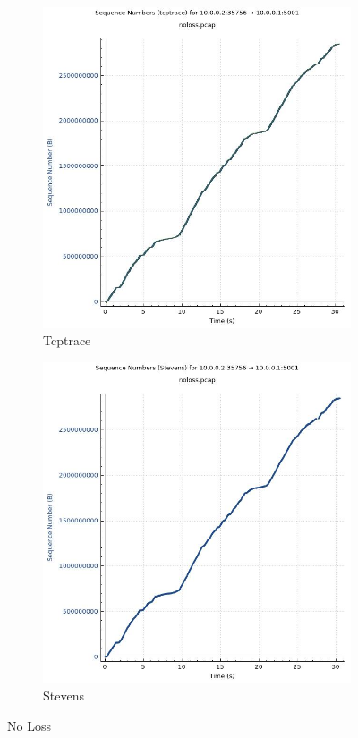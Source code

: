 \documentclass{article}
\begin{document}
\begin{figure}[htp]
    \centering
    \begin{subfigure}{.5\textwidth}
        \centering
        \includegraphics[width=\linewidth]{nolosstcptrace}
        \caption{Tcptrace}
    \end{subfigure}%
    \begin{subfigure}{.5\textwidth}
        \centering
        \includegraphics[width=\linewidth]{nolossstevens}
        \caption{Stevens}
    \end{subfigure}
    \caption{No Loss}
\end{figure}
\end{document}
